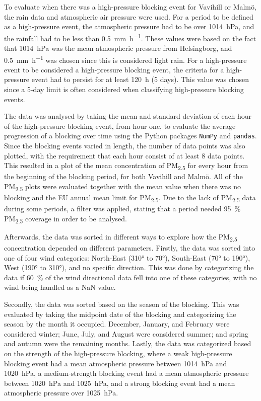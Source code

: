 To evaluate when there was a high-pressure blocking event for Vavihill or Malmö, the rain data and atmospheric air pressure were used. For a period to be defined as a high-pressure event, the atmospheric pressure had to be over \SI{1014}{\hecto\pascal}, and the rainfall had to be less than \SI{0.5}{\mm\per\hour}. These values were based on the fact that \SI{1014}{\hecto\pascal} was the mean atmospheric pressure from Helsingborg, and \SI{0.5}{\mm\per\hour} was chosen since this is considered light rain. For a high-pressure event to be considered a high-pressure blocking event, the criteria for a high-pressure event had to persist for at least \SI{120}{\hour} (5 days). This value was chosen since a 5-day limit is often considered when classifying high-pressure blocking events. 

The data was analysed by taking the mean and standard deviation of each hour of the high-pressure blocking event, from hour one, to evaluate the average progression of a blocking over time using the Python packages \texttt{NumPy} and \texttt{pandas}. Since the blocking events varied in length, the number of data points was also plotted, with the requirement that each hour consist of at least 8 data points. This resulted in a plot of the mean concentration of PM\textsubscript{2.5} for every hour from the beginning of the blocking period, for both Vavihill and Malmö. All of the PM\textsubscript{2.5} plots were evaluated together with the mean value when there was no blocking and the EU annual mean limit for PM\textsubscript{2.5}. Due to the lack of PM\textsubscript{2.5} data during some periods, a filter was applied, stating that a period needed \SI{95}{\%} PM\textsubscript{2.5} coverage in order to be analysed.

Afterwards, the data was sorted in different ways to explore how the PM\textsubscript{2.5} concentration depended on different parameters. Firstly, the data was sorted into one of four wind categories: North-East (310° to 70°), South-East (70° to 190°), West (190° to 310°), and no specific direction. This was done by categorizing the data if \SI{60}{\%} of the wind directional data fell into one of these categories, with no wind being handled as a NaN value.

Secondly, the data was sorted based on the season of the blocking. This was evaluated by taking the midpoint date of the blocking and categorizing the season by the month it occupied. December, January, and February were considered winter; June, July, and August were considered summer; and spring and autumn were the remaining months. Lastly, the data was categorized based on the strength of the high-pressure blocking, where a weak high-pressure blocking event had a mean atmospheric pressure between \SI{1014}{\hecto\pascal} and \SI{1020}{\hecto\pascal}, a medium-strength blocking event had a mean atmospheric pressure between \SI{1020}{\hecto\pascal} and \SI{1025}{\hecto\pascal}, and a strong blocking event had a mean atmospheric pressure over \SI{1025}{\hecto\pascal}.

